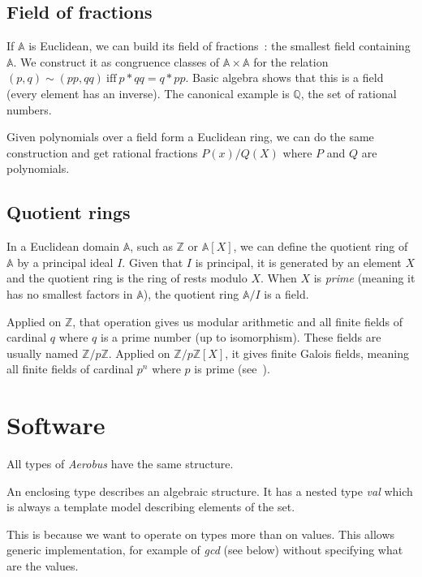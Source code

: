 \documentclass[twocolumn, switch]{article}
\begin{document}
\subsection{Field of fractions}
If $\mathbb{A}$ is Euclidean, we can build its field of fractions~: the smallest field containing $\mathbb{A}$.
We construct it as congruence classes of $\mathbb{A}\times \mathbb{A}$ for the relation $(p,q) \sim (pp, qq)\  \mathrm{iff}\ p*qq = q*pp$. Basic algebra shows that this is a field (every element has an inverse). The canonical example is $\mathbb{Q}$, the set of rational numbers.

Given polynomials over a field form a Euclidean ring, we can do the same construction and get rational fractions $P(x) / Q(X)$ where $P$ and $Q$ are polynomials.

\subsection{Quotient rings}

In a Euclidean domain $\mathbb{A}$, such as $\mathbb{Z}$ or $\mathbb{A}[X]$, we can define the quotient ring of $\mathbb{A}$ by a principal ideal $I$. Given that $I$ is principal, it is generated by an element $X$ and the quotient ring is the ring of rests modulo $X$. When $X$ is \textit{prime} (meaning it has no smallest factors in $\mathbb{A}$), the quotient ring $\mathbb{A}/I$ is a field.

Applied on $\mathbb{Z}$, that operation gives us modular arithmetic and all finite fields of cardinal $q$ where $q$ is a prime number (up to isomorphism). These fields are usually named $\mathbb{Z}/p\mathbb{Z}$. Applied on $\mathbb{Z}/p\mathbb{Z}[X]$, it gives finite Galois fields, meaning all finite fields of cardinal $p^n$ where $p$ is prime (see~\cite{evariste1846memoire}).

\section{Software}

All types of \textit{Aerobus} have the same structure.

An enclosing type describes an algebraic structure. It has a nested type \textit{val} which is always a template model describing elements of the set.

This is because we want to operate on types more than on values. This allows generic implementation, for example of \textit{gcd} (see below) without specifying what are the values.
\end{document}
